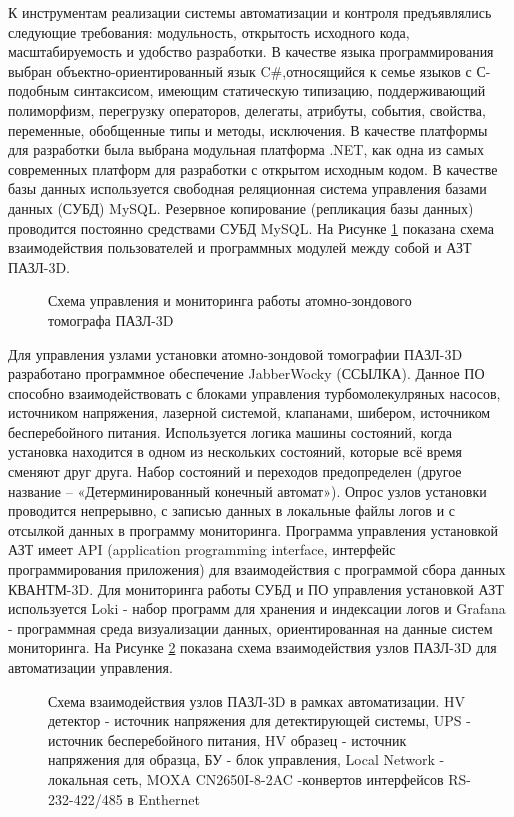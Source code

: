 К инструментам реализации системы автоматизации и контроля предъявлялись следующие требования: модульность, открытость исходного кода, масштабируемость и удобство разработки. В качестве языка программирования выбран объектно-ориентированный язык C$\#$,относящийся к семье языков с С-подобным синтаксисом, имеющим статическую типизацию, поддерживающий полиморфизм, перегрузку операторов, делегаты, атрибуты, события, свойства, переменные, обобщенные типы и методы, исключения. В качестве платформы для разработки была выбрана модульная платформа .NET, как одна из самых современных платформ для разработки с открытом исходным кодом. В качестве базы данных используется свободная реляционная система управления базами данных (СУБД) MySQL. Резервное копирование (репликация базы данных) проводится постоянно средствами СУБД MySQL. На Рисунке \cref{fig:auto_APPLE_manage}  показана схема взаимодействия пользователей и программных модулей между собой и АЗТ ПАЗЛ-3D.

\begin{figure}[htb]
	\caption{Схема управления и мониторинга работы атомно-зондового томографа ПАЗЛ-3D}
	\label{fig:auto_APPLE_manage}
\end{figure}

Для управления узлами установки атомно-зондовой томографии ПАЗЛ-3D разработано программное обеспечение JabberWocky (ССЫЛКА). Данное ПО способно взаимодействовать с блоками управления турбомолекулряных насосов, источником напряжения, лазерной системой, клапанами, шибером, источником бесперебойного питания. Используется логика машины состояний, когда установка находится в одном из нескольких состояний, которые всё время сменяют друг друга. Набор состояний и переходов предопределен (другое название – «Детерминированный конечный автомат»). Опрос узлов установки проводится непрерывно, с записью данных в локальные файлы логов и с отсылкой данных в программу мониторинга. Программа управления установкой АЗТ имеет API (application programming interface, интерфейс программирования приложения) для взаимодействия с программой сбора данных КВАНТМ-3D. Для мониторинга работы СУБД и ПО управления установкой АЗТ используется Loki - набор программ для хранения и индексации логов и Grafana - программная среда визуализации данных, ориентированная на данные систем мониторинга. На Рисунке \cref{fig:auto_APPLE_scheme} показана схема взаимодействия узлов ПАЗЛ-3D для автоматизации управления.

\begin{figure}[htb]
	\caption{Схема взаимодействия узлов ПАЗЛ-3D в рамках автоматизации. HV детектор - источник напряжения для детектирующей системы, UPS - источник бесперебойного питания, HV образец - источник напряжения для образца, БУ - блок управления, Local Network - локальная сеть, MOXA CN2650I-8-2AC -конвертов интерфейсов RS-232-422/485 в Enthernet}
	\label{fig:auto_APPLE_scheme}
\end{figure}

